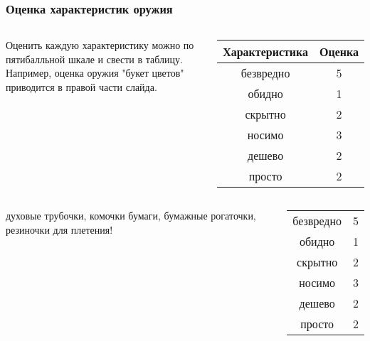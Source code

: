 \begin{frame}
    \frametitle{Оценка характеристик оружия}

    \begin{columns}
            Оценить каждую характеристику можно по пятибалльной шкале и свести в таблицу. Например, оценка оружия \alert{"букет цветов"} приводится в правой части слайда.
            
            
            \begin{center}
                \begin{tabular}{c|c}
                    \hline\hline
                    Характеристика   & Оценка\\ \hline\hline
                    безвредно        & 5 \\
                    обидно           & 1 \\
                    скрытно          & 2 \\
                    носимо           & 3 \\
                    дешево           & 2 \\
                    просто           & 2 \\ \hline
                \end{tabular}
            \end{center}
    \end{columns}    
\end{frame}

\begin{frame}
    \begin{columns}
            духовые трубочки, комочки бумаги, бумажные рогаточки, резиночки для плетения!
            
            \begin{center}
                \begin{tabular}{c|c}
                    \hline
                    безвредно        & 5 \\
                    обидно           & 1 \\
                    скрытно          & 2 \\
                    носимо           & 3 \\
                    дешево           & 2 \\
                    просто           & 2 \\ \hline
                \end{tabular}
            \end{center}
    \end{columns}    
\end{frame}

